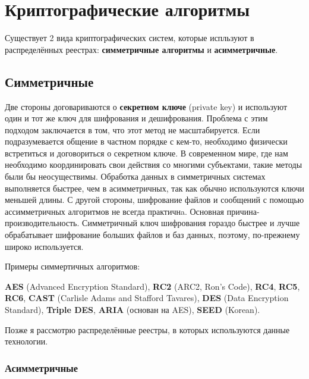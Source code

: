 \documentclass[russian, a4paper, 12pt]{article}
\begin{document}
\section{Криптографические алгоритмы}
Существует 2 вида криптографических систем, которые испльзуют в распределённых
реестрах: \textbf{симметричные алгоритмы} и \textbf{асимметричные}.
\subsection{Симметричные}

 Две стороны договариваются о \textbf{секретном ключе} (private key) и используют один и
 тот же ключ для шифрования и дешифрования. Проблема с этим подходом
 заключается в том, что этот метод не масштабируется. Если подразумевается
 общение в частном порядке с кем-то, необходимо физически встретиться и
 договориться о секретном ключе. В современном мире, где нам необходимо
 координировать свои действия со многими субъектами, такие методы были бы
 неосуществимы. Обработка данных в симметричных системах выполняется быстрее,
 чем в асимметричных, так как обычно используются ключи меньшей длины. С другой
 стороны, шифрование файлов и сообщений с помощью ассимметричных алгоритмов не
 всегда практичнa. Основная причина-производительность. Симметричный ключ
 шифрования гораздо быстрее и лучше обрабатывает шифрование больших файлов и
 баз данных, поэтому, по-прежнему широко используется.

 Примеры симмертичных алгоритмов:

\textbf{AES} (Advanced Encryption Standard), \textbf{RC2} (ARC2, Ron's Code),
\textbf{RC4}, \textbf{RC5}, \textbf{RC6}, \textbf{CAST} (Carlisle Adams and
Stafford Tavares), \textbf{DES} (Data Encryption Standard), \textbf{Triple
DES}, \textbf{ARIA} (основан на AES), \textbf{SEED} (Korean).

Позже я рассмотрю распределённые реестры, в которых используются данные технологии.

\subsubsection{Асимметричные}
\end{document}
